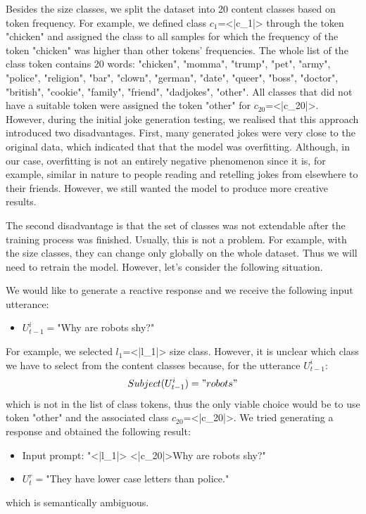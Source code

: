 Besides the size classes, we split the dataset into 20 content classes based on token frequency. For example, we defined class \( c_1\)=<|c\_1|> through the token "chicken" and assigned the class to all samples for which the frequency of the token "chicken" was higher than other tokens' frequencies. The whole list of the class token contains 20 words: "chicken", "momma", "trump", "pet", "army", "police", "religion", "bar", "clown", "german", "date", "queer", "boss", "doctor", "british", "cookie", "family", "friend", "dadjokes", "other".
All classes that did not have a suitable token were assigned the token "other" for \( c_{20}\)=<|c\_20|>. However, during the initial joke generation testing, we realised that this approach introduced two disadvantages. First, many generated jokes were very close to the original data, which indicated that that the model was overfitting. Although, in our case, overfitting is not an entirely negative phenomenon since it is, for example, similar in nature to people reading and retelling jokes from elsewhere to their friends. However, we still wanted the model to produce more creative results.

The second disadvantage is that the set of classes was not extendable after the training process was finished. Usually, this is not a problem. For example, with the size classes, they can change only globally on the whole dataset. Thus we will need to retrain the model. However, let's consider the following situation.

We would like to generate a reactive response and we receive the following input utterance:
\begin{itemize}
    \item \( U_{t-1}^i = \)"Why are robots shy?"
\end{itemize}
For example, we selected \( l_1\)=<|l\_1|> size class. However, it is unclear which class we have to select from the content classes because, for the utterance \( U_{t-1}^i\):
\[ Subject(U_{t-1}^i)="robots"\]
which is not in the list of class tokens, thus the only viable choice would be to use token "other" and the associated class \( c_{20}\)=<|c\_20|>. We tried generating a response and obtained the following result:
\begin{itemize}
    \item Input prompt: "<|l\_1|> <|c\_20|>Why are robots shy?"
    \item \( U_{t}^r = \)"They have lower case letters than police."
\end{itemize}
which is semantically ambiguous.

